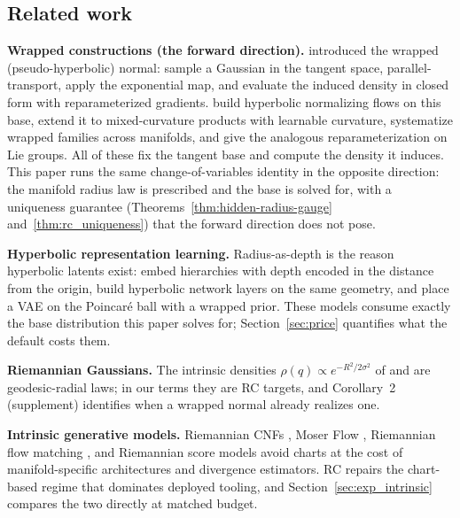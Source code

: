 \documentclass{article}
\theoremstyle{definition}
\theoremstyle{remark}
\begin{document}
\subsection{Related work}
\label{sec:related}
\textbf{Wrapped constructions (the forward direction).} \citet{nagano2019wrapped} introduced the wrapped (pseudo-hyperbolic) normal: sample a Gaussian in the tangent space, parallel-transport, apply the exponential map, and evaluate the induced density in closed form with reparameterized gradients. \citet{bose2020latent} build hyperbolic normalizing flows on this base, \citet{skopek2019mixed} extend it to mixed-curvature products with learnable curvature, \citet{galaz2022wrapped} systematize wrapped families across manifolds, and \citet{falorsi2019lie} give the analogous reparameterization on Lie groups. All of these fix the tangent base and compute the density it induces. This paper runs the same change-of-variables identity in the opposite direction: the manifold radius law is prescribed and the base is solved for, with a uniqueness guarantee (Theorems~\ref{thm:hidden-radius-gauge} and~\ref{thm:rc_uniqueness}) that the forward direction does not pose.

\textbf{Hyperbolic representation learning.} Radius-as-depth is the reason hyperbolic latents exist: \citet{nickel2017poincare} embed hierarchies with depth encoded in the distance from the origin, \citet{ganea2018hyperbolic} build hyperbolic network layers on the same geometry, and \citet{mathieu2019poincare} place a VAE on the Poincar\'e ball with a wrapped prior. These models consume exactly the base distribution this paper solves for; Section~\ref{sec:price} quantifies what the default costs them.

\textbf{Riemannian Gaussians.} The intrinsic densities $\rho(q)\propto e^{-R^2/2\sigma^2}$ of \citet{pennec2006intrinsic} and \citet{said2017riemannian} are geodesic-radial laws; in our terms they are RC targets, and Corollary~2 (supplement) identifies when a wrapped normal already realizes one.

\textbf{Intrinsic generative models.} Riemannian CNFs \citep{mathieu2020riemannian,lou2020neural}, Moser Flow \citep{rozen2021moser}, Riemannian flow matching \citep{chen2023flow}, and Riemannian score models \citep{debortoli2022riemannian} avoid charts at the cost of manifold-specific architectures and divergence estimators. RC repairs the chart-based regime that dominates deployed tooling, and Section~\ref{sec:exp_intrinsic} compares the two directly at matched budget.
\end{document}
